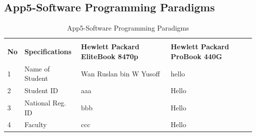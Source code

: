 \begin{landscape}
\subsection{App5-Software Programming Paradigms}
	
	\begin{table}[ht]
		\begin{center}
			\caption{App5-Software Programming Paradigms}		
			\label{table:App5-Software Programming Paradigms}	
			
			\begin{tabular}{ |p{0.5cm}|p{5.0cm}|p{9.0cm}|p{9.0cm}|}
				\rowcolor{gray!10}			
				\hline \multicolumn{4}{|c|}{\textbf{Software Programming Paradigms}} \\ [1.0ex]
				\rowcolor{gray!10}
				\hline \textbf{No} & \textbf{Specifications}    & \textbf{Hewlett Packard EliteBook 8470p} & \textbf{Hewlett Packard ProBook 440G}\\ 
				
				\hline 1 & Name of Student    & Wan Ruslan bin W Yusoff & hello\\ 
				\hline 2 & Student ID         &  aaa & Hello\\ 
				\hline 3 & National Reg. ID   & bbb  & Hello\\ 
				\hline 4 & Faculty            & ccc  & Hello\\ 
				
				\hline
			\end{tabular}
		\end{center}
	\end{table}  
	
\end{landscape}	
\clearpage
